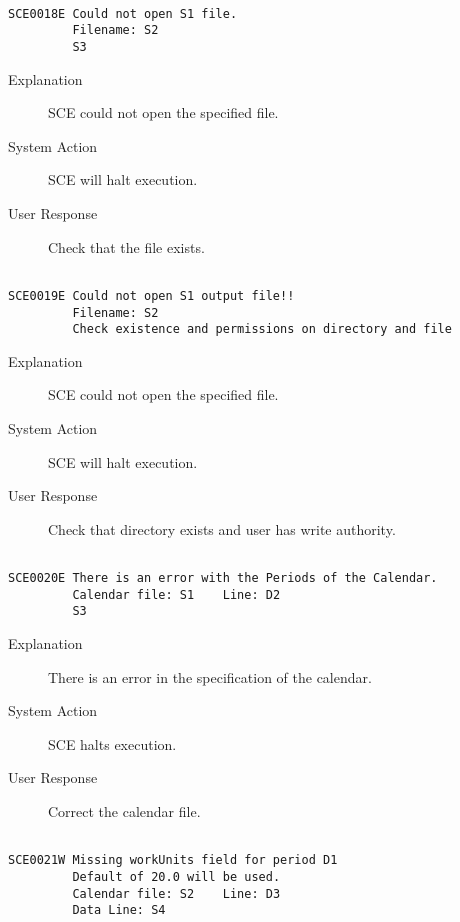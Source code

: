 \hrulefill
\begin{verbatim}

SCE0018E Could not open S1 file.
         Filename: S2
         S3
\end{verbatim}
\begin{description}
\item[Explanation]  SCE could not open the specified file.

\item[System Action]  SCE will halt execution.

\item[User Response]  Check that the file exists.
\end{description}
\hrulefill
\begin{verbatim}

SCE0019E Could not open S1 output file!!
         Filename: S2
         Check existence and permissions on directory and file
\end{verbatim}
\begin{description}
\item[Explanation]  SCE could not open the specified file.

\item[System Action]  SCE will halt execution.

\item[User Response]  Check that directory exists and user has write authority.
\end{description}
\hrulefill
\begin{verbatim}

SCE0020E There is an error with the Periods of the Calendar.
         Calendar file: S1    Line: D2
         S3
\end{verbatim}
\begin{description}
\item[Explanation]  There is an error in the specification of the calendar.

\item[System Action]  SCE halts execution.

\item[User Response]  Correct the calendar file.
\end{description}
\hrulefill
\begin{verbatim}

SCE0021W Missing workUnits field for period D1 
         Default of 20.0 will be used.
         Calendar file: S2    Line: D3
         Data Line: S4
         
\end{verbatim}
